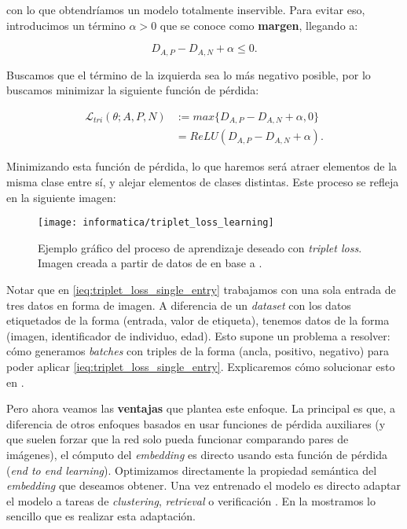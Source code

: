 con lo que obtendríamos un modelo totalmente inservible. Para evitar eso, introducimos un término $\alpha > 0$ que se conoce como \textbf{margen}, llegando a:

\begin{equation}
	D_{A, P} - D_{A, N} + \alpha \leq 0.
\end{equation}

Buscamos que el término de la izquierda sea lo más negativo posible, por lo buscamos minimizar la siguiente función de pérdida:

\begin{equation} \label{ieq:triplet_loss_single_entry}
	\begin{split}
		\mathcal{L}_{tri}(\theta; A, P, N) & := max \{D_{A, P} - D_{A, N} + \alpha, 0 \} \\
		&= ReLU(D_{A, P} - D_{A, N} + \alpha).
	\end{split}
\end{equation}

Minimizando esta función de pérdida, lo que haremos será atraer elementos de la misma clase entre sí, y alejar elementos de clases distintas. Este proceso se refleja en la siguiente imagen:

\begin{figure}[H]
	\centering
	\texttt{[image: informatica/triplet\_loss\_learning]}
	\caption{Ejemplo gráfico del proceso de aprendizaje deseado con \textit{triplet loss}. Imagen creada a partir de datos de \cite{informatica:cacd_dataset} en base a \cite{informatica:facenet}.}
\end{figure}

Notar que en \eqref{ieq:triplet_loss_single_entry} trabajamos con una sola entrada de tres datos en forma de imagen. A diferencia de un \textit{dataset} con los datos etiquetados de la forma (entrada, valor de etiqueta), tenemos datos de la forma (imagen, identificador de individuo, edad). Esto supone un problema a resolver: cómo generamos \textit{batches} con triples de la forma (ancla, positivo, negativo) para poder aplicar \eqref{ieq:triplet_loss_single_entry}. Explicaremos cómo solucionar esto en .

Pero ahora veamos las \textbf{ventajas} que plantea este enfoque. La principal es que, a diferencia de otros enfoques basados en usar funciones de pérdida auxiliares (y que suelen forzar que la red solo pueda funcionar comparando pares de imágenes), el cómputo del \textit{embedding} es directo usando esta función de pérdida (\textit{end to end learning}). Optimizamos directamente la propiedad semántica del \textit{embedding} que deseamos obtener. Una vez entrenado el modelo es directo adaptar el modelo a tareas de \textit{clustering}, \textit{retrieval} o verificación \cite{informatica:principal}. En la  mostramos lo sencillo que es realizar esta adaptación.

